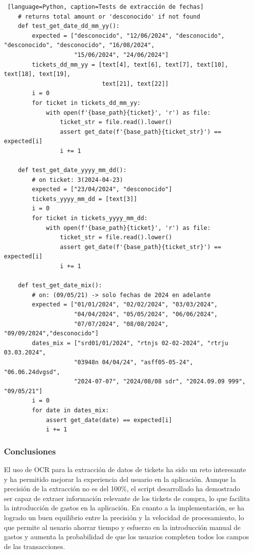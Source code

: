 \begin{lstlisting} [language=Python, caption=Tests de extracción de fechas]
    # returns total amount or 'desconocido' if not found
    def test_get_date_dd_mm_yy():
        expected = ["desconocido", "12/06/2024", "desconocido", "desconocido", "desconocido", "16/08/2024",
                    "15/06/2024", "24/06/2024"]
        tickets_dd_mm_yy = [text[4], text[6], text[7], text[10], text[18], text[19],
                            text[21], text[22]]
        i = 0
        for ticket in tickets_dd_mm_yy:
            with open(f'{base_path}{ticket}', 'r') as file:
                ticket_str = file.read().lower()
                assert get_date(f'{base_path}{ticket_str}') == expected[i]
                i += 1

    def test_get_date_yyyy_mm_dd():
        # on ticket: 3(2024-04-23)
        expected = ["23/04/2024", "desconocido"]
        tickets_yyyy_mm_dd = [text[3]]
        i = 0
        for ticket in tickets_yyyy_mm_dd:
            with open(f'{base_path}{ticket}', 'r') as file:
                ticket_str = file.read().lower()
                assert get_date(f'{base_path}{ticket_str}') == expected[i]
                i += 1

    def test_get_date_mix():
        # on: (09/05/21) -> solo fechas de 2024 en adelante
        expected = ["01/01/2024", "02/02/2024", "03/03/2024", 
                    "04/04/2024", "05/05/2024", "06/06/2024", 
                    "07/07/2024", "08/08/2024", "09/09/2024","desconocido"]
        dates_mix = ["srd01/01/2024", "rtnjs 02-02-2024", "rtrju 03.03.2024", 
                    "03948n 04/04/24", "asff05-05-24", "06.06.24dvgsd", 
                    "2024-07-07", "2024/08/08 sdr", "2024.09.09 999", "09/05/21"]
        i = 0
        for date in dates_mix:
            assert get_date(date) == expected[i]
            i += 1
\end{lstlisting}

\subsubsection{Conclusiones}
El uso de OCR para la extracción de datos de tickets ha sido un reto interesante y ha permitido mejorar la experiencia del usuario en la aplicación. Aunque la precisión de la extracción no es del 100\%, el script desarrollado ha demostrado ser capaz de extraer información relevante de los tickets de compra, lo que facilita la introducción de gastos en la aplicación. En cuanto a la implementación, se ha logrado un buen equilibrio entre la precisión y la velocidad de procesamiento, lo que permite al usuario ahorrar tiempo y esfuerzo en la introducción manual de gastos y aumenta la probabilidad de que los usuarios completen todos los campos de las transacciones.

